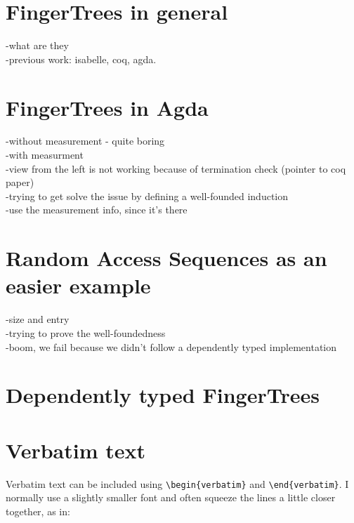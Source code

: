 \documentclass[12pt,twoside,notitlepage]{report}
\begin{document}
\section{FingerTrees in general}

-what are they \\
-previous work: isabelle, coq, agda. \\

\section{FingerTrees in Agda}

-without measurement - quite boring \\
-with measurment \\
-view from the left is not working because of termination check (pointer to coq paper) \\
-trying to get solve the issue by defining a well-founded induction \\
-use the measurement info, since it's there \\

\section{Random Access Sequences as an easier example}

-size and entry \\
-trying to prove the well-foundedness \\
-boom, we fail because we didn't follow a dependently typed implementation \\

\section{Dependently typed FingerTrees}



\section{Verbatim text}

Verbatim text can be included using \verb|\begin{verbatim}| and
\verb|\end{verbatim}|. I normally use a slightly smaller font and
often squeeze the lines a little closer together, as in:
\end{document}
